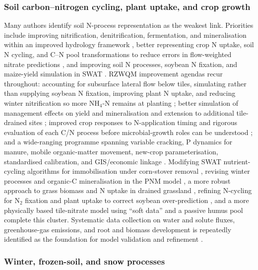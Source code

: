 \subsubsection{Soil carbon--nitrogen cycling, plant uptake, and crop growth}

Many authors identify soil N-process representation as the weakest link. Priorities include improving nitrification, denitrification, fermentation, and mineralisation within an improved hydrology framework \parencite{Smith2020}, better representing crop N uptake, soil N cycling, and C--N pool transformations to reduce errors in flow-weighted nitrate predictions \parencite{Fang2012}, and improving soil N processes, soybean N fixation, and maize-yield simulation in SWAT \parencite{Hu2007}. RZWQM improvement agendas recur throughout: accounting for subsurface lateral flow below tiles, simulating rather than supplying soybean N fixation, improving plant N uptake, and reducing winter nitrification so more NH$_4$-N remains at planting \parencite{Ma2007}; better simulation of management effects on yield and mineralisation and extension to additional tile-drained sites \parencite{Ma2007b}; improved crop responses to N-application timing and rigorous evaluation of each C/N process before microbial-growth roles can be understood \parencite{Ma2008}; and a wide-ranging programme spanning variable cracking, P dynamics for manure, mobile organic-matter movement, new-crop parameterisation, standardised calibration, and GIS/economic linkage \parencite{Ma2001}. Modifying SWAT nutrient-cycling algorithms for immobilisation under corn-stover removal \parencite{Malone2019}, revising winter processes and organic-C mineralisation in the PNM model \parencite{Marjerison2016}, a more robust approach to grass biomass and N uptake in drained grassland \parencite{Bechtold2007}, refining N-cycling for N$_2$ fixation and plant uptake to correct soybean over-prediction \parencite{Bakhsh2004}, and a more physically based tile-nitrate model using ``soft data'' and a passive humus pool \parencite{Qi2025} complete this cluster. Systematic data collection on water and solute fluxes, greenhouse-gas emissions, and root and biomass development is repeatedly identified as the foundation for model validation and refinement \parencite{Ma2025}.

\subsubsection{Winter, frozen-soil, and snow processes}

